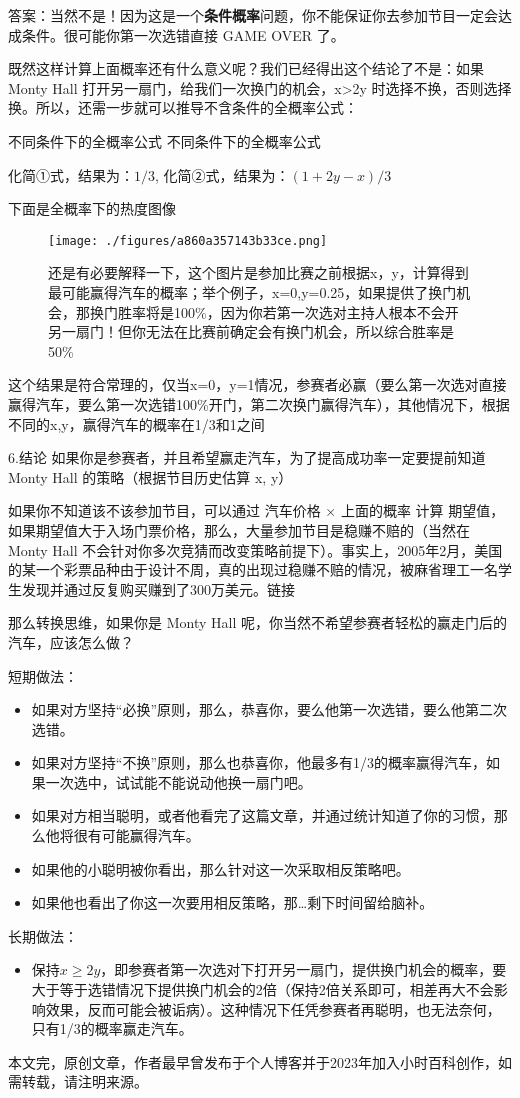 答案：当然不是！因为这是一个\textbf{条件概率}问题，你不能保证你去参加节目一定会达成条件。很可能你第一次选错直接 GAME OVER 了。

既然这样计算上面概率还有什么意义呢？我们已经得出这个结论了不是：如果 Monty Hall 打开另一扇门，给我们一次换门的机会，x>2y 时选择不换，否则选择换。所以，还需一步就可以推导不含条件的全概率公式：

不同条件下的全概率公式
不同条件下的全概率公式

化简①式，结果为：$1/3$,
化简②式，结果为：$(1+2y-x)/3$

下面是全概率下的热度图像

\begin{figure}[ht]
\centering
\texttt{[image: ./figures/a860a357143b33ce.png]}
\caption{还是有必要解释一下，这个图片是参加比赛之前根据x，y，计算得到最可能赢得汽车的概率；举个例子，x=0,y=0.25，如果提供了换门机会，那换门胜率将是100\%，因为你若第一次选对主持人根本不会开另一扇门！但你无法在比赛前确定会有换门机会，所以综合胜率是50\%} \label{fig_MontyH2}
\end{figure}

这个结果是符合常理的，仅当x=0，y=1情况，参赛者必赢（要么第一次选对直接赢得汽车，要么第一次选错100\%开门，第二次换门赢得汽车），其他情况下，根据不同的x,y，赢得汽车的概率在1/3和1之间

6.结论
如果你是参赛者，并且希望赢走汽车，为了提高成功率一定要提前知道 Monty Hall 的策略（根据节目历史估算 x, y）

如果你不知道该不该参加节目，可以通过 汽车价格 × 上面的概率 计算 期望值，如果期望值大于入场门票价格，那么，大量参加节目是稳赚不赔的（当然在 Monty Hall 不会针对你多次竞猜而改变策略前提下）。事实上，2005年2月，美国的某一个彩票品种由于设计不周，真的出现过稳赚不赔的情况，被麻省理工一名学生发现并通过反复购买赚到了300万美元。链接

那么转换思维，如果你是 Monty Hall 呢，你当然不希望参赛者轻松的赢走门后的汽车，应该怎么做？

短期做法：

\begin{itemize}
\item 如果对方坚持“必换”原则，那么，恭喜你，要么他第一次选错，要么他第二次选错。
\item 如果对方坚持“不换”原则，那么也恭喜你，他最多有1/3的概率赢得汽车，如果一次选中，试试能不能说动他换一扇门吧。
\item 如果对方相当聪明，或者他看完了这篇文章，并通过统计知道了你的习惯，那么他将很有可能赢得汽车。
\item 如果他的小聪明被你看出，那么针对这一次采取相反策略吧。
\item 如果他也看出了你这一次要用相反策略，那…剩下时间留给脑补。
\end{itemize}

长期做法：

\begin{itemize}
\item 保持$x\ge 2y$，即参赛者第一次选对下打开另一扇门，提供换门机会的概率，要大于等于选错情况下提供换门机会的2倍（保持2倍关系即可，相差再大不会影响效果，反而可能会被诟病）。这种情况下任凭参赛者再聪明，也无法奈何，只有1/3的概率赢走汽车。
\end{itemize}

本文完，原创文章，作者最早曾发布于个人博客并于2023年加入小时百科创作，如需转载，请注明来源。
